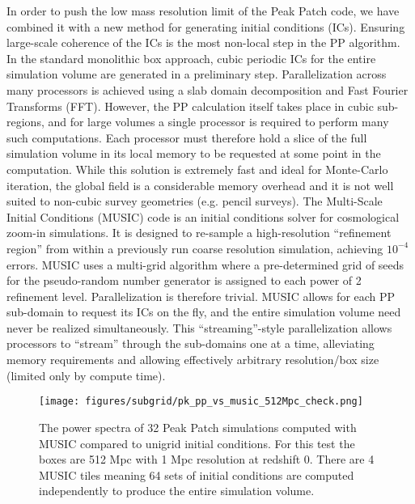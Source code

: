 In order to push the low mass resolution limit of the Peak Patch code, we have combined it with a new method for generating initial conditions (ICs). Ensuring large-scale coherence of the ICs is the most non-local step in the PP algorithm. In the standard monolithic box approach, cubic periodic ICs for the entire simulation volume are generated in a preliminary step. Parallelization across many processors is achieved using a slab domain decomposition and Fast Fourier Transforms (FFT). However, the PP calculation itself takes place in cubic sub-regions, and for large volumes a single processor is required to perform many such computations. Each processor must therefore hold a slice of the full simulation volume in its local memory to be requested at some point in the computation. While this solution is extremely fast and ideal for Monte-Carlo iteration, the global field is a considerable memory overhead and it is not well suited to non-cubic survey geometries (e.g. pencil surveys). The Multi-Scale Initial Conditions (MUSIC) \citep{music} code is an initial conditions solver for cosmological zoom-in simulations. It is designed to re-sample a high-resolution ``refinement region'' from within a previously run coarse resolution simulation, achieving $10^{-4}$ errors. MUSIC uses a multi-grid algorithm where a pre-determined grid of seeds for the pseudo-random number generator is assigned to each power of 2 refinement level. Parallelization is therefore trivial. MUSIC allows for each PP sub-domain to request its ICs on the fly, and the entire simulation volume need never be realized simultaneously. This ``streaming''-style parallelization allows processors to ``stream'' through the sub-domains one at a time, alleviating memory requirements and allowing effectively arbitrary resolution/box size (limited only by compute time).

\begin{figure} %
\begin{center}
\texttt{[image: figures/subgrid/pk\_pp\_vs\_music\_512Mpc\_check.png]}%
\caption{The power spectra of 32 Peak Patch simulations computed with MUSIC compared to unigrid initial conditions. For this test the boxes are 512 Mpc with 1 Mpc resolution at redshift 0. There are 4 MUSIC tiles meaning 64 sets of initial conditions are computed independently to produce the entire simulation volume.}
\label{pkcheck}
\end{center}
\end{figure}

